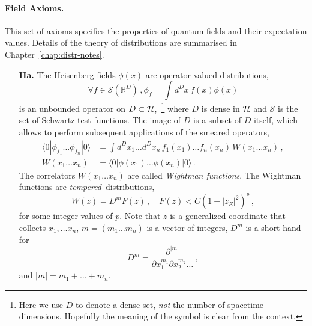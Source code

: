 \paragraph{Field Axioms.}

This set of axioms specifies the properties of quantum fields and their
expectation values. Details of the theory of distributions are summarised 
in Chapter~\ref{chap:distr-notes}.

\begin{enumerate}
    \item [{\bf IIa.}] The Heisenberg fields $\phi(x)$ are operator-valued distributions, \ie
    \begin{equation}
        \label{eq:OpValuedDistr}
        \forall f \in \mathcal{S}(\mathbb{R}^D)\, , 
        \phi_f = \int d^Dx\, f(x) \phi(x)
    \end{equation}
    is an unbounded operator on $D \subset \mathcal{H}$,~\footnote{
        Here we use $D$ to denote a dense set, {\em not} the number of 
        spacetime dimensions. Hopefully the meaning of the symbol is clear
        from the context. 
    } where $D$ is dense in $\mathcal{H}$
    and $\mathcal{S}$ is the set of Schwartz test functions. The image of $D$ is
    a subset of $D$ itself, which allows to perform subsequent applications of
    the smeared operators, \eg
    \begin{align}
        \langle 0 | \phi_{f_1} \ldots \phi_{f_n} | 0\rangle 
        &= \int d^Dx_1 \ldots d^Dx_n\, f_1(x_1) \ldots f_n(x_n) \, 
        W(x_1 \ldots x_n) \, , \\
        W(x_1 \ldots x_n)
        &= \langle 0 | \phi(x_1) \ldots \phi(x_n) | 0\rangle\, .
    \end{align} 
    The correlators $W(x_1 \ldots x_n)$ are called {\em Wightman functions}. The
    Wightman functions are {\em tempered}\ distributions, \ie
    \begin{equation}
        \label{eq:TempDistr}
        W(z) = D^m F(z)\, , \quad F(z) < C (1 + |z_E|^2)^p\, ,
    \end{equation}
    for some integer values of $p$. Note that $z$ is a generalized coordinate
    that collects $x_1, \ldots x_n$, $m=(m_1 \ldots m_n)$ is a vector of
    integers, $D^m$ is a short-hand for 
    \begin{equation}
        \label{eq:MultiDeriv}
        D^m = 
        \frac{\partial^{|m|}}{\partial x_1^{m_1} \partial x_2^{m_2} \ldots}\, ,
    \end{equation}
    and $|m| = m_1 + \ldots + m_n$.


\end{enumerate}

